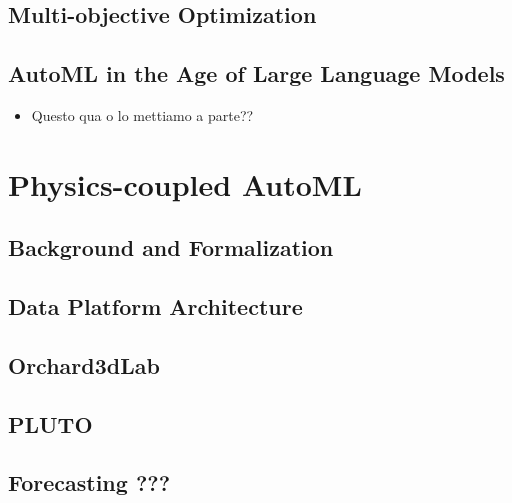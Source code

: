\documentclass[a4paper,12pt,times,numbered,print,index]{Classes/PhDThesisPSnPDF}
\begin{document}
\chapter{Multi-objective Optimization}
\label{automl-chap:moo}

\chapter{AutoML in the Age of Large Language Models}
\label{automl-chap:llm}
\begin{itemize}
    \item Questo qua o lo mettiamo a parte??
\end{itemize}

\part{Physics-coupled AutoML}\label{part:farming}

\chapter{Background and Formalization}
\label{precision-chap:background}

\chapter{Data Platform Architecture}
\label{precision-chap:architecture}

\chapter{Orchard3dLab}
\label{precision-chap:orchard}

\chapter{PLUTO}
\label{precision-chap:pluto}

\chapter{Forecasting ???}
\label{precision-chap:forecasting}
\end{document}
